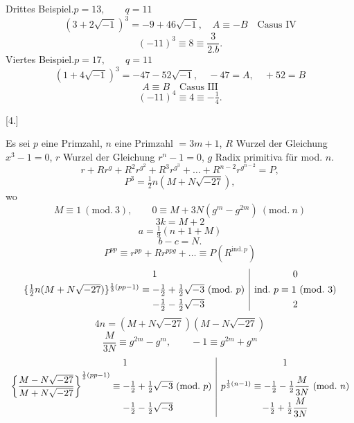 \noindent{}\hspace*{\parindent}Drittes Beispiel.\qquad $p=13,\qquad q=11$
\[(3+2\sqrt{-1})^3=-9+46\sqrt{-1},\quad A\equiv-B\quad\text{Casus IV}\]
\[(-11)^3\equiv8\equiv\dfrac{3}{2.b}.\]
\noindent\hspace*{\parindent}Viertes Beispiel.\qquad $p=17,\qquad q=11$
\[(1+4\sqrt{-1})^3=-47-52\sqrt{-1},\quad-47=A,\quad+52=B\]
\[A\equiv B\quad\text{Casus III}\]
\[(-11)^4\equiv4\equiv-\tfrac14.\]
\begin{center}[4.]\end{center}
\noindent\hspace*{\parindent}Es sei $p$ eine Primzahl, $n$ eine Primzahl $=3m+1$, $R$ Wurzel der Gleichung $x^3-1=0$, $r$ Wurzel der Gleichung $r^n-1=0$, $g$ Radix primitiva für mod. $n$.
\[r+Rr^g+R^2r^{g^2}+R^3r^{g^3}+\ldots+R^{n-2}r^{g^{n-2}}=P,\]
\[P^3=\tfrac12 n(M+N\sqrt{-27}),\]
\noindent wo
\[M\equiv1\ (\mathrm{mod.}\ 3),\qquad0\equiv M+3N(g^m-g^{2m})\ (\mathrm{mod.}\ n)\]
\[3k=M+2\]
\[a=\tfrac19(n+1+M)\]
\[b-c=N.\]
\[P^{pp}\equiv r^{pp}+Rr^{ppg}+\ldots\equiv P(R^{\mathrm{ind.}\,p})\]
\begingroup\footnotesize
\[\begin{array}{r@{}l|c}
&1&0\\[3pt]
\{\tfrac12 n(M+N\sqrt{-27})\}^{\frac13(pp-1)}\equiv{}&-\tfrac12+\tfrac12\sqrt{-3}\ (\mathrm{mod.}\ p)&\mathrm{ind.}\ p\equiv1\ (\mathrm{mod.}\ 3)\\[3pt]
&-\tfrac12-\tfrac12\sqrt{-3}&2
\end{array}\]
\endgroup
\[4n=(M+N\sqrt{-27})(M-N\sqrt{-27})\]
\[\dfrac{M}{3N}\equiv g^{2m}-g^m,\qquad-1\equiv g^{2m}+g^m\]
\begingroup\footnotesize
\[\begin{array}{r@{}l|c}
&1&1\\[3pt]
\left\{\dfrac{M-N\sqrt{-27}}{M+N\sqrt{-27}}\right\}^{\frac13(pp-1)}\equiv{}&-\tfrac12+\tfrac12\sqrt{-3}\ (\mathrm{mod.}\ p)&p^{\frac13(n-1)}\equiv-\tfrac12-\tfrac12\dfrac{M}{3N}\ (\mathrm{mod.}\ n)\\[5pt]
&-\tfrac12-\tfrac12\sqrt{-3}&-\tfrac12+\tfrac12\dfrac{M}{3N}
\end{array}\]
\endgroup
